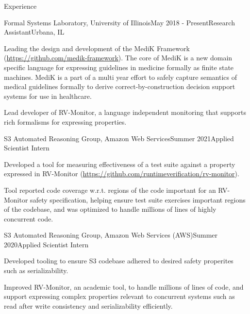 \documentclass{resume} %
\begin{document}
\begin{rSection}{Experience}

\begin{rSubsection}{Formal Systems Laboratory, University of Illinois}{May 2018 - Present}{Research Assistant}{Urbana, IL}
\item Leading the design and development of the MediK Framework (\url{https://github.com/medik-framework}).
  The core of MediK is a new domain
  specific language for expressing guidelines in medicine formally as finite
  state machines. MediK is a part of a multi year effort to safely capture
  semantics of medical guidelines formally to derive correct-by-construction
  decision support systems for use in healthcare.
\item Lead developer of RV-Monitor, a language independent monitoring
  that supports rich formalisms for expressing properties.
\end{rSubsection}

\begin{rSubsection}{S3 Automated Reasoning Group, Amazon Web Services}{Summer 2021}{Applied Scientist Intern}{}
\item Developed a tool for measuring effectiveness of a test suite against a property expressed in
  RV-Monitor (\url{https://github.com/runtimeverification/rv-monitor}).
\item Tool reported code coverage w.r.t. regions of the code important for an
  RV-Monitor safety specification, helping ensure test suite exercises important
  regions of the codebase, and was optimized to handle millions of lines of highly
  concurrent code.
\end{rSubsection}

\begin{rSubsection}{S3 Automated Reasoning Group, Amazon Web Services (AWS)}{Summer 2020}{Applied Scientist Intern}{}
\item Developed tooling to ensure S3 codebase adhered to desired safety properites such as serializability.
\item Improved RV-Monitor, an academic tool, to handle millions of lines of
  code, and support expressing complex properties relevant to concurrent systems
    such as read after write consistency and serializability efficiently.
\end{rSubsection}


\end{rSection}
\end{document}
